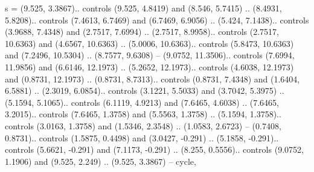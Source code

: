 {s} = {(9.525, 3.3867).. controls (9.525, 4.8419) and (8.546, 5.7415) .. (8.4931, 5.8208).. controls (7.4613, 6.7469) and (6.7469, 6.9056) .. (5.424, 7.1438).. controls (3.9688, 7.4348) and (2.7517, 7.6994) .. (2.7517, 8.9958).. controls (2.7517, 10.6363) and (4.6567, 10.6363) .. (5.0006, 10.6363).. controls (5.8473, 10.6363) and (7.2496, 10.5304) .. (8.7577, 9.6308) -- (9.0752, 11.3506).. controls (7.6994, 11.9856) and (6.6146, 12.1973) .. (5.2652, 12.1973).. controls (4.6038, 12.1973) and (0.8731, 12.1973) .. (0.8731, 8.7313).. controls (0.8731, 7.4348) and (1.6404, 6.5881) .. (2.3019, 6.0854).. controls (3.1221, 5.5033) and (3.7042, 5.3975) .. (5.1594, 5.1065).. controls (6.1119, 4.9213) and (7.6465, 4.6038) .. (7.6465, 3.2015).. controls (7.6465, 1.3758) and (5.5563, 1.3758) .. (5.1594, 1.3758).. controls (3.0163, 1.3758) and (1.5346, 2.3548) .. (1.0583, 2.6723) -- (0.7408, 0.8731).. controls (1.5875, 0.4498) and (3.0427, -0.291) .. (5.1858, -0.291).. controls (5.6621, -0.291) and (7.1173, -0.291) .. (8.255, 0.5556).. controls (9.0752, 1.1906) and (9.525, 2.249) .. (9.525, 3.3867) -- cycle},
